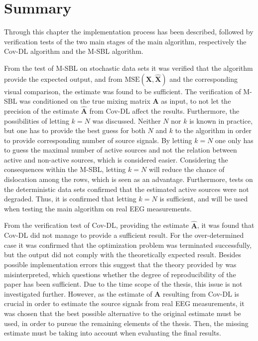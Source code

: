 \section{Summary}
Through this chapter the implementation process has been described, followed by verification tests of the two main stages of the main algorithm, respectively the Cov-DL algorithm and the M-SBL algorithm. 

From the test of M-SBL on stochastic data sets it was verified that the algorithm provide the expected output, and from $\text{MSE}(\mathbf{X}, \hat{\mathbf{X}})$ and the corresponding visual comparison, the estimate was found to be sufficient. 
The verification of M-SBL was conditioned on the true mixing matrix $\mathbf{A}$ as input, to not let the precision of the estimate $\hat{\mathbf{A}}$ from Cov-DL affect the results. 
Furthermore, the possibilities of letting $k = N$ was discussed. 
Neither $N$ nor $k$ is known in practice, but one has to provide the best guess for both $N$ and $k$ to the algorithm in order to provide corresponding number of source signals. 
By letting $k = N$ one only has to guess the maximal number of active sources and not the relation between active and non-active sources, which is considered easier. 
Considering the consequences within the M-SBL, letting $k = N$ will reduce the chance of dislocation among the rows, which is seen as an advantage. 
Furthermore, tests on the deterministic data sets confirmed that the estimated active sources were not degraded. 
Thus, it is confirmed that letting $k = N$ is sufficient, and will be used when testing the main algorithm on real EEG measurements. 

From the verification test of Cov-DL, providing the estimate $\hat{\mathbf{A}}$, it was found that Cov-DL did not manage to provide a sufficient result. 
For the over-determined case it was confirmed that the optimization problem was terminated successfully, but the output did not comply with the theoretically expected result. 
Besides possible implementation errors this suggest that the theory provided by \cite{phd2015} was misinterpreted, which questions whether the degree of reproducibility of the paper has been sufficient. 
Due to the time scope of the thesis, this issue is not investigated further. 
However, as the estimate of $\mathbf{A}$ resulting from Cov-DL is crucial in order to estimate the source signals from real EEG measurements, it was chosen that the best possible alternative to the original estimate must be used, in order to pursue the remaining elements of the thesis. 
Then, the missing estimate must be taking into account when evaluating the final results.

